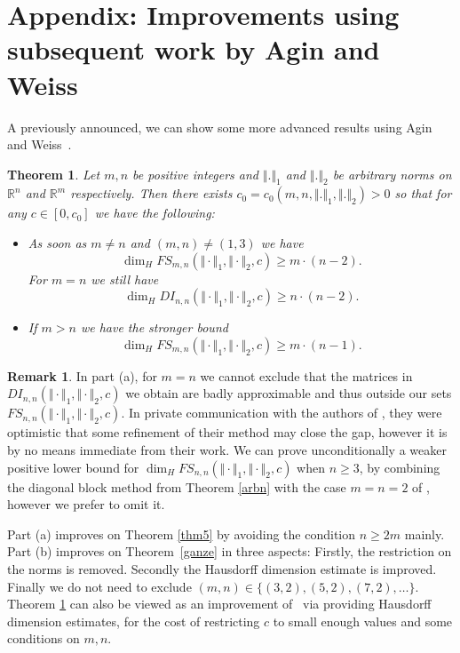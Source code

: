 \documentclass[10pt]{amsart}
\newtheorem{theorem}{Theorem}[section]
\theoremstyle{definition}
\newtheorem{remark}{Remark}
\begin{document}
 \section{Appendix: Improvements using subsequent work by Agin and Weiss }

 A previously announced, we can show some more advanced results using Agin and Weiss~\cite{AginWeiss2024}.

 \begin{theorem} \label{AWe}
     Let $m,n$ be positive integers and $\Vert.\Vert_1$ and $\Vert.\Vert_2$ be arbitrary norms on $\mathbb{R}^n$ and $\mathbb{R}^m$ respectively. Then there 
     exists $c_0=c_0(m,n,\Vert.\Vert_1,\Vert.\Vert_2)>0$ so that
     for any $c\in [0,c_0]$ we have the following:
     \begin{itemize}
         \item[(a)] 
          As soon as $m\ne n$ and $(m,n)\ne (1,3)$  
         we
         have
         \[
     \dim_H FS_{m,n}(\Vert \cdot \Vert_{1},\Vert \cdot \Vert_{2},c)\ge m\cdot (n-2).
     \]
     For $m=n$ we still have
     \[
     \dim_H DI_{n,n}(\Vert \cdot \Vert_{1},\Vert \cdot \Vert_{2},c)\ge n\cdot (n-2).
     \]
     \item[(b)] If $m>n$ we have the stronger bound 
     \[
     \dim_H FS_{m,n}(\Vert \cdot \Vert_{1},\Vert \cdot \Vert_{2},c)\ge m\cdot (n-1).
     \]
     \end{itemize}
 \end{theorem}

 \begin{remark}
     In part (a), 
     for $m=n$ we cannot exclude that the matrices in $DI_{n,n}(\Vert \cdot \Vert_{1},\Vert \cdot \Vert_{2},c)$ we obtain are badly approximable and thus outside our sets $FS_{n,n}(\Vert \cdot \Vert_{1},\Vert \cdot \Vert_{2},c)$.
     In private communication with the authors of \cite{AginWeiss2024}, 
     they were optimistic that some refinement of their method may close the gap, however it is by no means immediate from their work.
     We can prove unconditionally a weaker positive lower bound for $\dim_H FS_{n,n}(\Vert \cdot \Vert_{1},\Vert \cdot \Vert_{2},c)$ when $n\ge 3$, by combining the diagonal block method from Theorem \ref{arbn} with the case $m=n=2$ of \cite{AginWeiss2024}, however we prefer to omit it.
 \end{remark}

 Part (a) improves on 
 Theorem \ref{thm5} by avoiding the condition $n\ge 2m$ mainly.
 Part (b) improves on Theorem~\ref{ganze} in three aspects: Firstly, the restriction on the norms is removed. Secondly the Hausdorff dimension estimate is improved. 
 Finally we do not need to exclude $(m,n)\in \{(3,2), (5,2), (7,2), \ldots \}$.
 Theorem \ref{AWe} can also be viewed as an improvement of~\cite{AginWeiss2024} via providing Hausdorff dimension estimates, for the cost of restricting $c$ to small enough values and some conditions on $m,n$. 
 
\end{document}
